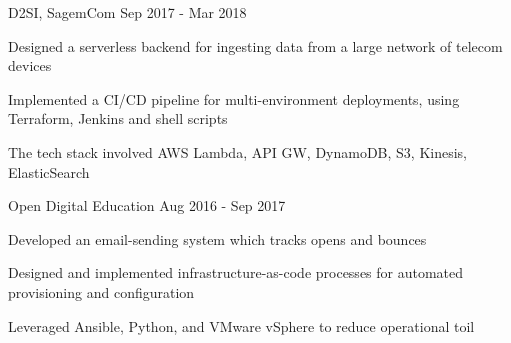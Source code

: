\begin{cventries}
\cventry
{} %
{D2SI, SagemCom} %
{Sep 2017 - Mar 2018} %
{} %
{ %
\begin{cvitems}
\item {Designed a serverless backend for ingesting data from a large network of telecom devices}
\item {Implemented a CI/CD pipeline for multi-environment deployments, using Terraform, Jenkins and shell scripts}
\item {The tech stack involved AWS Lambda, API GW, DynamoDB, S3, Kinesis, ElasticSearch}
\end{cvitems}
}

\cventry
{} %
{Open Digital Education} %
{Aug 2016 - Sep 2017} %
{} %
{ %
\begin{cvitems}
\item {Developed an email-sending system which tracks opens and bounces}
\item {Designed and implemented infrastructure-as-code processes for automated provisioning and configuration}
\item {Leveraged Ansible, Python, and VMware vSphere to reduce operational toil}
\end{cvitems}
}



\end{cventries}
